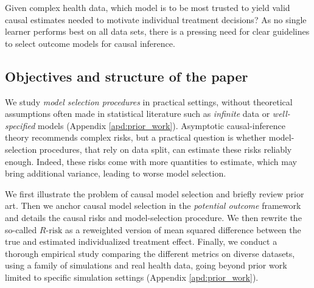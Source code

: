 \documentclass[11pt]{article}
\begin{document}
Given complex health data, which model is to be most trusted to yield 
valid causal estimates needed to motivate individual treatment decisions?
As no single learner performs best on all data sets, there is a
pressing need for clear guidelines to select outcome models for causal
inference.


\subsection{Objectives and structure of the paper}

We study \textit{model selection procedures} in practical settings,
without theoretical assumptions often made in statistical literature such
as \textit{infinite} data or \textit{well-specified} models (Appendix
\ref{apd:prior_work}). Asymptotic causal-inference theory recommends complex
risks, but a practical question is whether model-selection procedures, that rely
on data split, can estimate these risks reliably enough. Indeed, these
risks come with
more quantities to estimate, which may bring additional variance, leading to
worse model selection.

We first illustrate the problem of causal model selection and briefly review
prior art. Then we anchor causal model selection in the \emph{potential outcome}
framework and details the causal risks and model-selection procedure. We then
rewrite the so-called $R\text{-risk}$ as a reweighted version of mean squared
difference between the true and estimated individualized treatment effect.
Finally, we conduct a thorough empirical study comparing the different metrics
on diverse datasets, using a family of simulations and real health
data, going beyond prior work limited to specific simulation settings
\citep{schuler_comparison_2018,alaa_validating_2019} (Appendix
\ref{apd:prior_work}).

\end{document}
